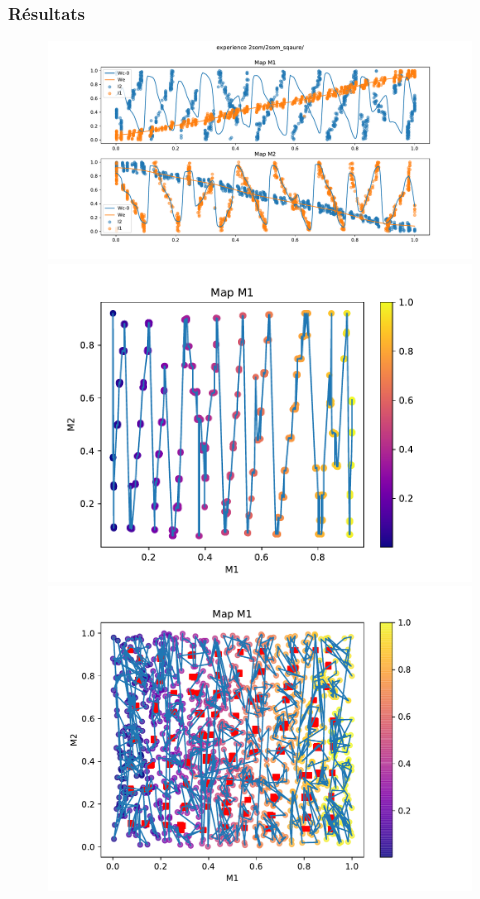 \subsubsection{Résultats}

\begin{figure}[h!]
\begin{minipage}{0.33\textwidth}
\includegraphics[width=\textwidth]{2som_square_w.pdf}
\end{minipage}
\begin{minipage}{0.33\textwidth}
\includegraphics[width=\textwidth]{2som_square_d.pdf}
\end{minipage}
\begin{minipage}{0.33\textwidth}
\includegraphics[width=\textwidth]{2som_square_din.pdf}

\end{minipage}
\end{figure}
